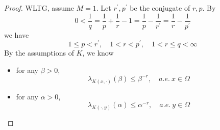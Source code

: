 \begin{proof}
	WLTG, assume $M=1$. Let $r^\prime,p^\prime$ be the conjugate of $r,p$. By
	\begin{equation*}
		0<\frac{1}{q}=\frac{1}{p}+\frac{1}{r}-1=\frac{1}{p}-\frac{1}{r^{\prime}}=\frac{1}{r}-\frac{1}{p^{\prime}}
	\end{equation*}
	we have
	\begin{equation*}
		1 \leq p<r^{\prime}, \quad 1<r<p^{\prime}, \quad 1<r \leq q<\infty
	\end{equation*}
	By the assumptions of $K$, we know
	\begin{itemize}
		\item for any $\beta > 0$,
		\begin{equation*}
			\lambda_{K(x, \cdot)}(\beta) \leq \beta^{-r},\quad a.e.~x \in \Omega
		\end{equation*}
		\item for any $\alpha> 0$,
		\begin{equation*}
			\lambda_{K(\cdot,y)}(\alpha) \leq \alpha^{-r},\quad a.e.~y \in \Omega
		\end{equation*}
	\end{itemize}


\end{proof}
